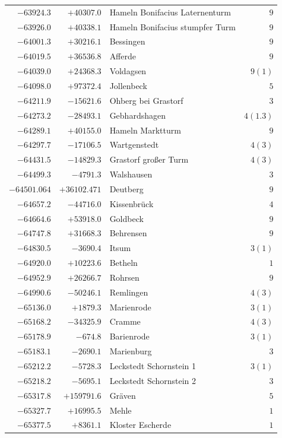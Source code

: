 \begin{center}
\begin{tabular}{r|r|p{170pt}|r}
\(-63924.3\)&\(+40307.0\)&Hameln Bonifacius Laternenturm&\(9\)\\
\(-63926.0\)&\(+40338.1\)&Hameln Bonifacius stumpfer Turm&\(9\)\\
\(-64001.3\)&\(+30216.1\)&Bessingen&\(9\)\\
\(-64019.5\)&\(+36536.8\)&Afferde&\(9\)\\
\(-64039.0\)&\(+24368.3\)&Voldagsen&\(9 (1)\)\\
\(-64098.0\)&\(+97372.4\)&Jollenbeck&\(5\)\\
\(-64211.9\)&\(-15621.6\)&Ohberg bei Grastorf&\(3\)\\
\(-64273.2\)&\(-28493.1\)&Gebhardshagen&\(4(1.3)\)\\
\(-64289.1\)&\(+40155.0\)&Hameln Marktturm&\(9\)\\
\(-64297.7\)&\(-17106.5\)&Wartgenstedt&\(4 (3)\)\\
\(-64431.5\)&\(-14829.3\)&Grastorf großer Turm&\(4 (3)\)\\
\(-64499.3\)&\(-4791.3\)&Walshausen&\(3\)\\
\(-64501.064\)&\(+36102.471\)&Deutberg&\(9\)\\
\(-64657.2\)&\(-44716.0\)&Kissenbrück&\(4\)\\
\(-64664.6\)&\(+53918.0\)&Goldbeck&\(9\)\\
\(-64747.8\)&\(+31668.3\)&Behrensen&\(9\)\\
\(-64830.5\)&\(-3690.4\)&Itsum&\(3 (1)\)\\
\(-64920.0\)&\(+10223.6\)&Betheln&\(1\)\\
\(-64952.9\)&\(+26266.7\)&Rohrsen&\(9\)\\
\(-64990.6\)&\(-50246.1\)&Remlingen&\(4 (3)\)\\
\(-65136.0\)&\(+1879.3\)&Marienrode&\(3 (1)\)\\
\(-65168.2\)&\(-34325.9\)&Cramme&\(4 (3)\)\\
\(-65178.9\)&\(-674.8\)&Barienrode&\(3 (1)\)\\
\(-65183.1\)&\(-2690.1\)&Marienburg&\(3\)\\
\(-65212.2\)&\(-5728.3\)&Leckstedt Schornstein 1&\(3 (1)\)\\
\(-65218.2\)&\(-5695.1\)&Leckstedt Schornstein 2&\(3\)\\
\(-65317.8\)&\(+159791.6\)&Gräven&\(5\)\\
\(-65327.7\)&\(+16995.5\)&Mehle&\(1\)\\
\(-65377.5\)&\(+8361.1\)&Kloster Escherde&\(1\)\\
\hline\end{tabular}\endgroup\end{center}
